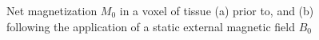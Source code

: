 \begin{figure}[ht]
\centering
{}
%
\caption{Net magnetization $M_0$ in a voxel of tissue (a) prior to, and (b) following the application of a static external magnetic field $B_0$~\cite{hendrick_1994}}
\label{fig:mr1}
\end{figure}

